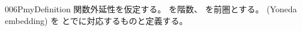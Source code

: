 \documentclass[index]{subfiles}
\begin{document}
\begin{myBlock}{006P}{myDefinition}
  関数外延性を仮定する。
  を階数、
  を前圏とする。
  (Yoneda embedding)
  を
  とでに対応するものと定義する。
\end{myBlock}
\end{document}
